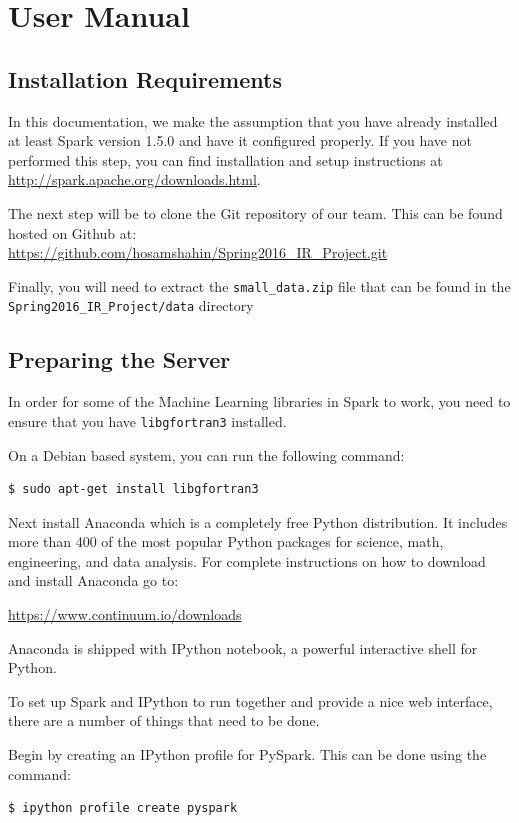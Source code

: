 \chapter{User Manual}\label{ch:userManual}
\lstset{basicstyle=\ttfamily}

\section{Installation Requirements}
In this documentation, we make the assumption that you have already installed at least Spark version 1.5.0 and have it configured properly. If you have not performed this step, you can find installation and setup instructions at \url{http://spark.apache.org/downloads.html}.

The next step will be to clone the Git repository of our team. This can be found hosted on Github at: \url{https://github.com/hosamshahin/Spring2016_IR_Project.git}

Finally, you will need to extract the \texttt{small\_data.zip} file that can be found in the\\ \texttt{Spring2016\_IR\_Project/data} directory

\section{Preparing the Server}
In order for some of the Machine Learning libraries in Spark to work, you need to ensure that you have \texttt{libgfortran3} installed.

On a Debian based system, you can run the following command:
\begin{lstlisting}[language=bash]
  $ sudo apt-get install libgfortran3
\end{lstlisting}

Next install Anaconda which is a completely free Python distribution. It includes more than 400 of the most popular Python packages for science, math, engineering, and data analysis. For complete instructions on how to download and install Anaconda go to:

\url{https://www.continuum.io/downloads}

Anaconda is shipped with IPython notebook, a powerful interactive shell for Python.

To set up Spark and IPython to run together and provide a nice web interface, there are a number of things that need to be done.

Begin by creating an IPython profile for PySpark. This can be done using the command:
\begin{lstlisting}[language=bash]
  $ ipython profile create pyspark
\end{lstlisting}


